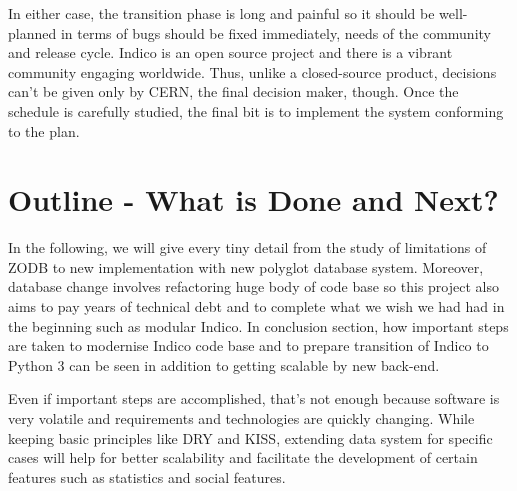 \par In either case, the transition phase is long and painful so it should be well-planned in terms of bugs should be fixed immediately, needs of the community and release cycle. Indico is an open source project and there is a vibrant community engaging worldwide. Thus, unlike a closed-source product, decisions can't be given only by \textsc{CERN}, the final decision maker, though. Once the schedule is carefully studied, the final bit is to implement the system conforming to the plan.

\section{Outline - What is Done and Next?}

\par In the following, we will give every tiny detail from the study of limitations of ZODB to new implementation with new polyglot database system. Moreover, database change involves refactoring huge body of code base so this project also aims to pay years of technical debt and to complete what we wish we had had in the beginning such as modular Indico. In conclusion section, how important steps are taken to modernise Indico code base and to prepare transition of Indico to Python 3 can be seen in addition to getting scalable by new back-end.

\par Even if important steps are accomplished, that's not enough because software is very volatile and requirements and technologies are quickly changing. While keeping basic principles like DRY and KISS, extending data system for specific cases will help for better scalability and facilitate the development of certain features such as statistics and social features.

